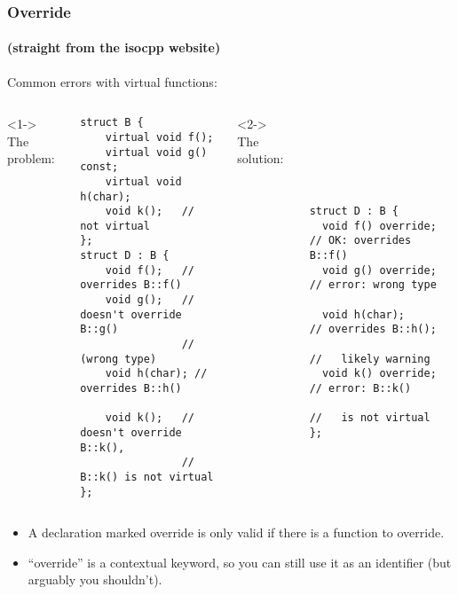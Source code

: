 \begin{frame}[fragile]
\frametitle{Override}
\framesubtitle{(straight from the isocpp website)}
Common errors with virtual functions:
\begin{columns}[t]
<1->
The problem:
{\scriptsize
\begin{verbatim}
struct B {
    virtual void f();
    virtual void g() const;
    virtual void h(char);
    void k();   // not virtual
};
struct D : B {
    void f();   // overrides B::f()
    void g();   // doesn't override B::g()
                //   (wrong type)
    void h(char); // overrides B::h()

    void k();   // doesn't override B::k(),
                // B::k() is not virtual
};
\end{verbatim}
}
<2->
The solution:
{\scriptsize
\begin{verbatim}






struct D : B {
  void f() override;  // OK: overrides B::f()
  void g() override;  // error: wrong type

  void h(char);       // overrides B::h();
                      //   likely warning
  void k() override;  // error: B::k()
                      //   is not virtual
};
\end{verbatim}
}
\end{columns}
\begin{itemize}
\item A declaration marked override is only valid if there is a function to override.
\item ``override'' is a contextual keyword, so you can still use it
  as an identifier (but arguably you shouldn't).
\end{itemize}
\begin{center}\end{center}
\end{frame}


